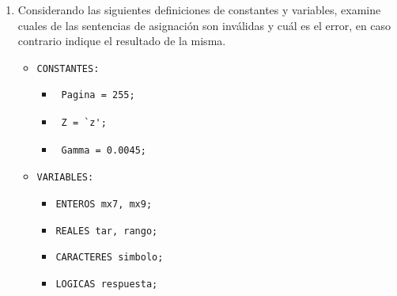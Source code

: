 \documentclass[a4paper,10pt]{article}
\begin{document}
\begin{enumerate}
\item Considerando las siguientes definiciones de constantes y variables, examine cuales de las sentencias de asignaci\'on son inv\'alidas y cu\'al es el error, en caso contrario indique el resultado de la misma.
    \begin{itemize}
        \item[] \verb=CONSTANTES:=
            \begin{itemize}
                \item[] \begin{verbatim} Pagina = 255;\end{verbatim}
                \item[] \begin{verbatim} Z = `z';\end{verbatim}
                \item[] \begin{verbatim} Gamma = 0.0045;\end{verbatim}
            \end{itemize}
        \item[] \verb=VARIABLES:=
            \begin{itemize}
                \item[] \verb=ENTEROS mx7, mx9;=
                \item[] \verb=REALES tar, rango;=
                \item[] \verb=CARACTERES simbolo;=
                \item[] \verb=LOGICAS respuesta;=
            \end{itemize}
    \end{itemize}


\end{enumerate}
\end{document}
